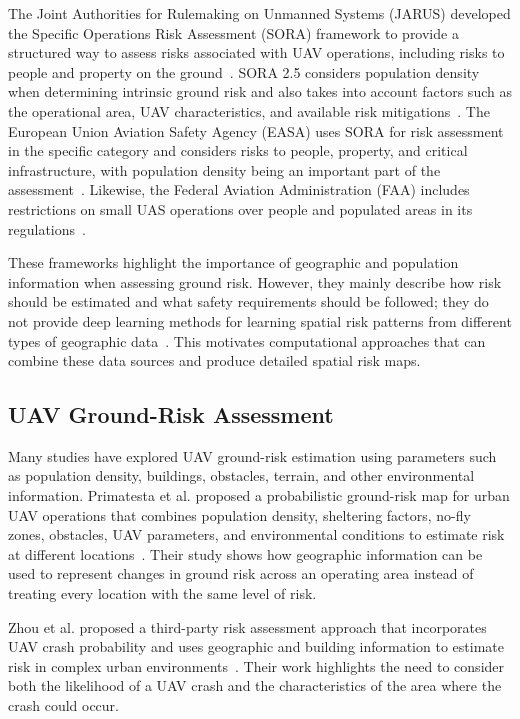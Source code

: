 \documentclass[sigconf, review=true]{acmart}
\begin{document}
The Joint Authorities for Rulemaking on Unmanned Systems (JARUS) developed the Specific Operations Risk Assessment (SORA) framework to provide a structured way to assess risks associated with UAV operations, including risks to people and property on the ground~\cite{jarus2023sora}. SORA 2.5 considers population density when determining intrinsic ground risk and also takes into account factors such as the operational area, UAV characteristics, and available risk mitigations~\cite{jarus2023sora}. The European Union Aviation Safety Agency (EASA) uses SORA for risk assessment in the specific category and considers risks to people, property, and critical infrastructure, with population density being an important part of the assessment~\cite{easa2026sora}. Likewise, the Federal Aviation Administration (FAA) includes restrictions on small UAS operations over people and populated areas in its regulations~\cite{faa2026part107}.

These frameworks highlight the importance of geographic and population information when assessing ground risk. However, they mainly describe how risk should be estimated and what safety requirements should be followed; they do not provide deep learning methods for learning spatial risk patterns from different types of geographic data~\cite{jarus2023sora,easa2026sora,faa2026part107}. This motivates computational approaches that can combine these data sources and produce detailed spatial risk maps.

\subsection{UAV Ground-Risk Assessment}

Many studies have explored UAV ground-risk estimation using parameters such as population density, buildings, obstacles, terrain, and other environmental information. Primatesta et al. proposed a probabilistic ground-risk map for urban UAV operations that combines population density, sheltering factors, no-fly zones, obstacles, UAV parameters, and environmental conditions to estimate risk at different locations~\cite{primatesta2020groundrisk}. Their study shows how geographic information can be used to represent changes in ground risk across an operating area instead of treating every location with the same level of risk.

Zhou et al. proposed a third-party risk assessment approach that incorporates UAV crash probability and uses geographic and building information to estimate risk in complex urban environments~\cite{zhou2025riskbased}. Their work highlights the need to consider both the likelihood of a UAV crash and the characteristics of the area where the crash could occur.
\end{document}
